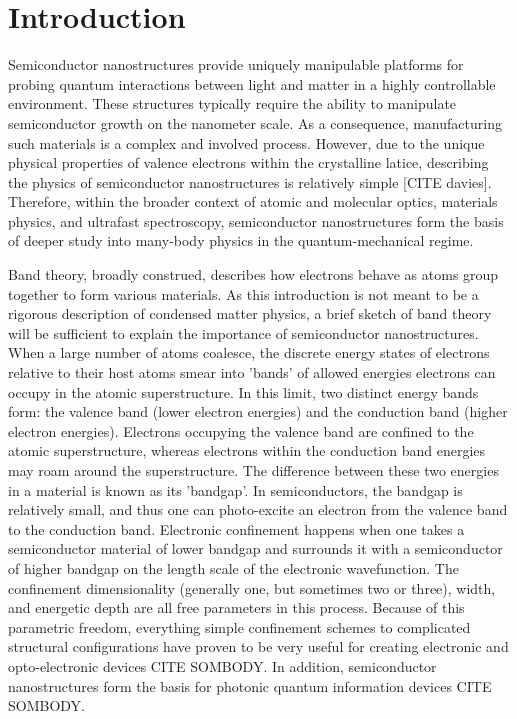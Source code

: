 \chapter{Introduction}

\indent Semiconductor nanostructures provide uniquely manipulable platforms for probing quantum interactions between light and matter in a highly controllable environment. These structures typically require the ability to manipulate semiconductor growth on the nanometer scale. As a consequence, manufacturing such materials is a complex and involved process. However, due to the unique physical properties of valence electrons within the crystalline latice, describing the physics of semiconductor nanostructures is relatively simple [CITE davies]. Therefore, within the broader context of atomic and molecular optics, materials physics, and ultrafast spectroscopy, semiconductor nanostructures form the basis of deeper study into many-body physics in the quantum-mechanical regime.

\indent Band theory, broadly construed, describes how electrons behave as atoms group together to form various materials. As this introduction is not meant to be a rigorous description of condensed matter physics, a brief sketch of 
band theory will be sufficient to explain the importance of semiconductor nanostructures. When a large number of atoms coalesce, the discrete energy states of electrons relative to their host atoms smear into 'bands' of allowed energies electrons can occupy in the atomic superstructure. In this limit, two distinct energy bands form: the valence band (lower electron energies) and the conduction band (higher electron energies). Electrons occupying the valence band are confined to the atomic superstructure, whereas electrons within the conduction band energies may roam around the superstructure. The difference between these two energies in a material is known as its 'bandgap'. In semiconductors, the bandgap is relatively small, and thus one can photo-excite an electron from the valence band to the conduction band. Electronic confinement happens when one takes a semiconductor material of lower bandgap and surrounds it with a semiconductor of higher bandgap on the length scale of the electronic wavefunction. The confinement dimensionality (generally one, but sometimes two or three), width, and energetic depth are all free parameters in this process. Because of this parametric freedom, everything simple confinement schemes to complicated structural configurations have proven to be very useful for creating electronic and opto-electronic devices CITE SOMBODY. In addition, semiconductor nanostructures form the basis for photonic quantum information devices CITE SOMBODY.

